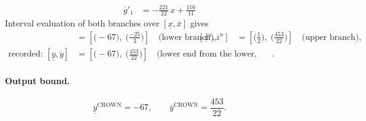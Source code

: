 \documentclass[11pt]{article}
\begin{document}
\begin{align*}
\overline{g}'_{1} &= -\frac{221}{22}\,x + \frac{116}{11}
\end{align*}
Interval evaluation of both branches over $[\underline{x}, \overline{x}]$ gives
\begin{align*}
[\underline{z}^{\ell}, \overline{z}^{\ell}] &= [\bigl(-67\bigr),\; \bigl(\frac{-25}{3}\bigr)] \quad\text{(lower branch)}, & [\underline{z}^{u}, \overline{z}^{u}] &= [\bigl(\frac{1}{2}\bigr),\; \bigl(\frac{453}{22}\bigr)] \quad\text{(upper branch)}, \\
\text{recorded: } [\underline{y}, \overline{y}] &= [\bigl(-67\bigr),\; \bigl(\frac{453}{22}\bigr)] \quad\text{(lower end from the lower, upper end from the upper branch)}.
\end{align*}
\paragraph{Output bound.}
\begin{equation*}
\underline{y}^{\text{CROWN}} = -67, \qquad \overline{y}^{\text{CROWN}} = \frac{453}{22}.
\end{equation*}
\end{document}
